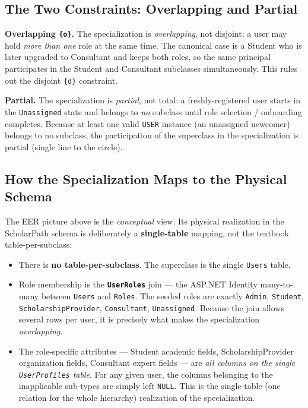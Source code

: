 \documentclass[11pt,a4paper]{article}
\begin{document}
\subsection{The Two Constraints: Overlapping and Partial}

\textbf{Overlapping \texttt{\{o\}}.} The specialization is \emph{overlapping}, not
disjoint: a user may hold \emph{more than one} role at the same time. The
canonical case is a Student who is later upgraded to Consultant and keeps both
roles, so the same principal participates in the Student and Consultant
subclasses simultaneously. This rules out the disjoint \texttt{\{d\}} constraint.

\textbf{Partial.} The specialization is \emph{partial}, not total: a
freshly-registered user starts in the \texttt{Unassigned} state and belongs to
\emph{no} subclass until role selection / onboarding completes. Because at least
one valid \texttt{USER} instance (an unassigned newcomer) belongs to no subclass,
the participation of the superclass in the specialization is partial (single
line to the circle).

\subsection{How the Specialization Maps to the Physical Schema}

The EER picture above is the \emph{conceptual} view. Its physical realization in
the ScholarPath schema is deliberately a \textbf{single-table} mapping, not the
textbook table-per-subclass:

\begin{itemize}[leftmargin=1.4em]
  \item There is \textbf{no table-per-subclass}. The superclass is the single
        \texttt{Users} table.
  \item Role membership is the \textbf{\texttt{UserRoles}} join --- the ASP.NET
        Identity many-to-many between \texttt{Users} and \texttt{Roles}. The
        seeded roles are exactly \texttt{Admin}, \texttt{Student},
        \texttt{ScholarshipProvider}, \texttt{Consultant}, \texttt{Unassigned}.
        Because the join allows several rows per user, it is precisely what makes
        the specialization \emph{overlapping}.
  \item The role-specific attributes --- Student academic fields,
        ScholarshipProvider organization fields, Consultant expert fields --- are
        \emph{all columns on the single \texttt{UserProfiles} table}. For any
        given user, the columns belonging to the inapplicable sub-types are
        simply left \texttt{NULL}. This is the single-table (one relation for the
        whole hierarchy) realization of the specialization.
\end{itemize}
\end{document}
